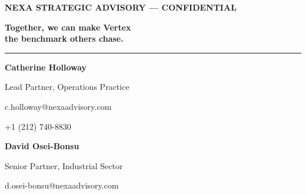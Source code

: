 {
\begin{frame}[plain]

  \vspace{1.2cm}
  \hspace{0.6cm}
  \begin{minipage}{0.84\paperwidth}
    \textcolor{NexaGold}{\scriptsize\bfseries\MakeUppercase{Nexa Strategic Advisory --- Confidential}}\par
    \vspace{0.5cm}
    \textcolor{NexaWhite}{\fontsize{18}{22}\selectfont\textbf{%
      Together, we can make Vertex\\
      the benchmark others chase.}}\par
    \vspace{0.55cm}
    \textcolor{NexaTeal!70}{\rule{3.6cm}{1.2pt}}\par
    \vspace{0.45cm}
    \begin{minipage}[t]{0.44\textwidth}
      \textcolor{NexaGray}{\small\textbf{Catherine Holloway}}\par
      \textcolor{NexaGray}{\scriptsize Lead Partner, Operations Practice}\par
      \vspace{0.15cm}
      \textcolor{NexaGray}{\scriptsize
        \faEnvelope\; c.holloway@nexaadvisory.com}\par
      \textcolor{NexaGray}{\scriptsize
        \faPhone\; +1 (212) 740-8830}
    \end{minipage}\hfill
    \begin{minipage}[t]{0.44\textwidth}
      \textcolor{NexaGray}{\small\textbf{David Osei-Bonsu}}\par
      \textcolor{NexaGray}{\scriptsize Senior Partner, Industrial Sector}\par
      \vspace{0.15cm}
      \textcolor{NexaGray}{\scriptsize
        \faEnvelope\; d.osei-bonsu@nexaadvisory.com}\par

\end{minipage}
\end{minipage}
\end{frame}}
